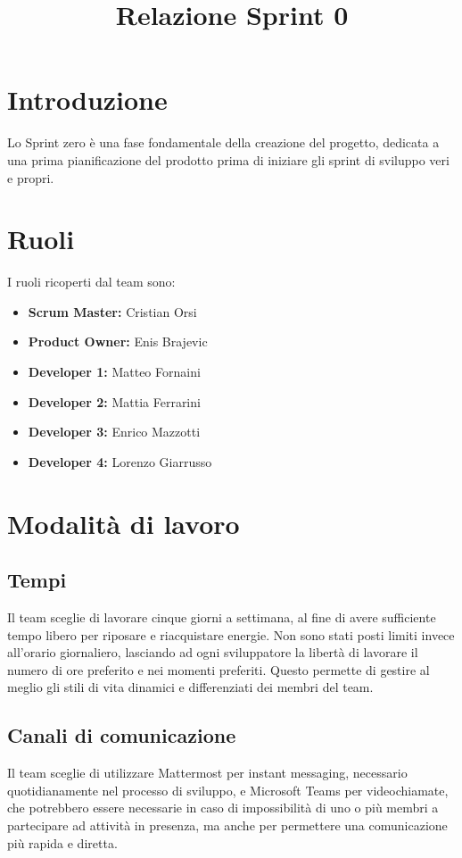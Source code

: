 \documentclass{article}
\title{Relazione Sprint 0}
\author{}
\date{}
\begin{document}
\maketitle

\section{Introduzione}
Lo Sprint zero è una fase fondamentale della creazione del progetto, dedicata a una prima pianificazione del prodotto prima di iniziare gli sprint di sviluppo veri e propri.

\section{Ruoli}
I ruoli ricoperti dal team sono:
\begin{itemize}[label={--}]
    \item \textbf{Scrum Master:} Cristian Orsi
    \item \textbf{Product Owner:} Enis Brajevic
    \item \textbf{Developer 1:} Matteo Fornaini
    \item \textbf{Developer 2:} Mattia Ferrarini
    \item \textbf{Developer 3:} Enrico Mazzotti
    \item \textbf{Developer 4:} Lorenzo Giarrusso
\end{itemize}

\section{Modalità di lavoro}

\subsection{Tempi}
Il team sceglie di lavorare cinque giorni a settimana, al fine di avere sufficiente tempo libero per riposare e riacquistare energie. Non sono stati posti limiti invece all'orario giornaliero, lasciando ad ogni sviluppatore la libertà di lavorare il numero di ore preferito e nei momenti preferiti. Questo permette di gestire al meglio gli stili di vita dinamici e differenziati dei membri del team. 

\subsection{Canali di comunicazione}
Il team sceglie di utilizzare Mattermost per instant messaging, necessario quotidianamente nel processo di sviluppo, e Microsoft Teams per videochiamate, che potrebbero essere necessarie in caso di impossibilità di uno o più membri a partecipare ad attività in presenza, ma anche per permettere una comunicazione più rapida e diretta.
\end{document}
